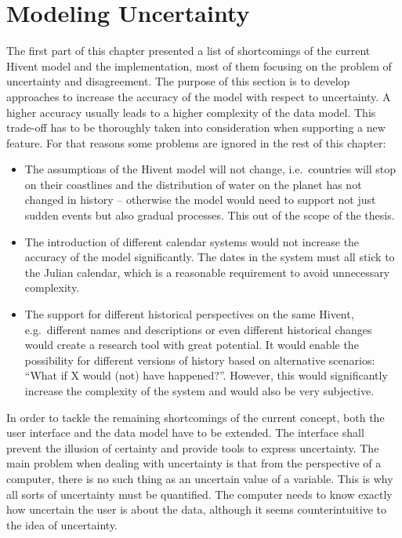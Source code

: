 


\section{Modeling Uncertainty} %
\label{sec:modelling_uncertainty}

The first part of this chapter presented a list of shortcomings of the current Hivent model and the implementation, most of them focusing on the problem of uncertainty and disagreement. The purpose of this section is to develop approaches to increase the accuracy of the model with respect to uncertainty. A higher accuracy usually leads to a higher complexity of the data model. This trade-off has to be thoroughly taken into consideration when supporting a new feature. For that reasons some problems are ignored in the rest of this chapter:

\begin{itemize}
  \item The assumptions of the Hivent model will not change, i.e.\ countries will stop on their coastlines and the distribution of water on the planet has not changed in history -- otherwise the model would need to support not just sudden events but also gradual processes. This out of the scope of the thesis.
  \item The introduction of different calendar systems would not increase the accuracy of the model significantly. The dates in the system must all stick to the Julian calendar, which is a reasonable requirement to avoid unnecessary complexity.
  \item The support for different historical perspectives on the same Hivent, e.g.\ different names and descriptions or even different historical changes would create a research tool with great potential. It would enable the possibility for different versions of history based on alternative scenarios: ``What if X would (not) have happened?''. However, this would significantly increase the complexity of the system and would also be very subjective.
\end{itemize}

In order to tackle the remaining shortcomings of the current concept, both the user interface and the data model have to be extended. The interface shall prevent the illusion of certainty and provide tools to express uncertainty. The main problem when dealing with uncertainty is that from the perspective of a computer, there is no such thing as an uncertain value of a variable. This is why all sorts of uncertainty must be quantified. The computer needs to know exactly how uncertain the user is about the data, although it seems counterintuitive to the idea of uncertainty.

